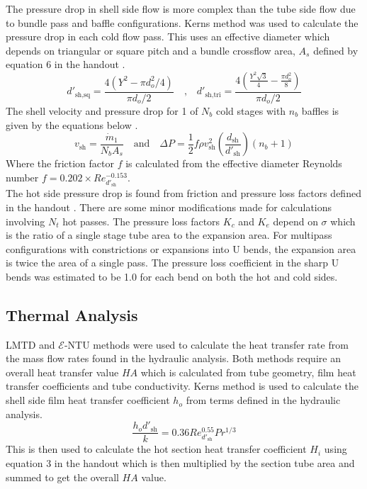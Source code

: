 \documentclass{article}
\begin{document}
The pressure drop in shell side flow is more complex than the tube side flow due to bundle pass and baffle configurations.
Kerns method was used to calculate the pressure drop in each cold flow pass.
This uses an effective diameter which depends on triangular or square pitch and a bundle crossflow area, $A_s$ defined by equation 6 in the handout \cite{handout}.
\begin{equation}
  d'_{\text{sh,sq}} = \frac{4(Y^2 - \pi d_o^2/4)}{\pi d_o / 2}  \quad \text{,} \quad d'_{\text{sh,tri}} = \frac{4 \left( \frac{Y^2 \sqrt{3}}{4} - \frac{\pi d_o^2}{8} \right)}{\pi d_o / 2}
\end{equation}
The shell velocity and pressure drop for 1 of $N_b$ cold stages with $n_b$ baffles is given by the equations below \cite{HE_design}.
\begin{equation}
  v_\text{sh} = \frac{\dot{m}_1}{N_b A_s} \quad \text{and} \quad \Delta P = \frac{1}{2}f \rho v_\text{sh}^2 \left( \frac{d_\text{sh}}{d'_\text{sh}} \right) (n_b + 1)
\end{equation}
Where the friction factor $f$ is calculated from the effective diameter Reynolds number $f = 0.202 \times Re_{d'_\text{sh}}^{-0.153}$. \\
The hot side pressure drop is found from friction and pressure loss factors defined in the handout \cite{handout}.
There are some minor modifications made for calculations involving $N_t$ hot passes.
The pressure loss factors $K_c$ and $K_e$ depend on $\sigma$ which is the ratio of a single stage tube area to the expansion area.
For multipass configurations with constrictions or expansions into U bends, the expansion area is twice the area of a single pass.
The pressure loss coefficient in the sharp U bends was estimated to be 1.0 for each bend on both the hot and cold sides.


\subsection{Thermal Analysis}

LMTD and $\mathcal{E}$-NTU methods were used to calculate the heat transfer rate from the mass flow rates found in the hydraulic analysis.
Both methods require an overall heat transfer value $HA$ which is calculated from tube geometry, film heat transfer coefficients and tube conductivity.
Kerns method is used to calculate the shell side film heat transfer coefficient $h_o$ from terms defined in the hydraulic analysis.
\begin{equation}
  \frac{h_o d'_{\text{sh}}}{k} = 0.36 Re^{0.55}_{d'_{\text{sh}}}Pr^{1/3}
\end{equation}
This is then used to calculate the hot section heat transfer coefficient $H_i$ using equation 3 in the handout \cite{handout} which is then
multiplied by the section tube area and summed to get the overall $HA$ value.
\end{document}
